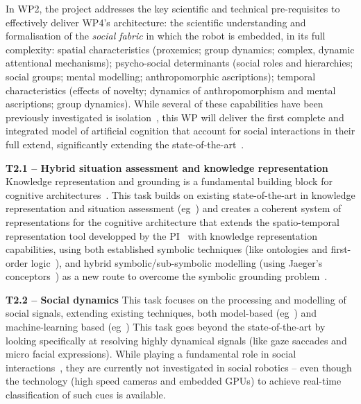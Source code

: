 \documentclass[11pt,a4paper]{report}
\begin{document}
\noindent{}

In WP2, the project addresses the key scientific and technical pre-requisites to
effectively deliver WP4's architecture:  the scientific understanding and
formalisation of the \emph{social fabric} in which the robot is embedded, in its
full complexity: spatial characteristics (proxemics; group dynamics; complex,
dynamic attentional mechanisms); psycho-social determinants (social roles and
hierarchies; social groups; mental modelling; anthropomorphic ascriptions);
temporal characteristics (effects of novelty; dynamics of anthropomorphism and
mental ascriptions; group dynamics).  While several of these capabilities have
been previously investigated is isolation~\cite{lemaignan2014dynamics,
flook2019impact,lemaignan2015youre, fink2014which, ros2010which,
warnier2012when, lemaignan2015mutual, dillenbourg2016symmetry,
winkle2019effective}, this WP will deliver the first complete and integrated
model of artificial cognition that account for social interactions in their full
extend, significantly extending the state-of-the-art~\cite{lemaignan2017artificial,
baxter2016cognitive}.


\textbf{T2.1 -- Hybrid situation assessment and knowledge representation}
Knowledge representation and grounding is a fundamental building block for
cognitive architectures~\cite{lemaignan2017artificial,beetz2010cram}. This task
builds on existing state-of-the-art in knowledge representation and situation
assessment (eg~\cite{citeneeded}) and creates a coherent system of
representations for the cognitive architecture that extends the 
spatio-temporal representation tool developped by the
PI~\cite{lemaignan2018underworlds,sallami2019simulation} with knowledge
representation capabilities, using both established symbolic techniques (like
ontologies and first-order logic~\cite{lemaignan2010oro, tenorth2009knowrob}),
and hybrid symbolic/sub-symbolic modelling (using Jaeger's
conceptors~\cite{jaeger2014controlling}) as a new route to overcome the symbolic
grounding problem~\cite{harnad1990symbol}.

\textbf{T2.2 -- Social dynamics} This task focuses on the processing and
modelling of social signals, extending existing techniques, both model-based
(eg~\cite{lemaignan2016realtime,others}) and machine-learning based
(eg~\cite{chetouani,others}) This task goes beyond the state-of-the-art by
looking specifically at resolving highly dynamical signals (like gaze saccades
and micro facial expressions). While playing a fundamental role in social
interactions~\cite{citeneeded}, they are currently not investigated in social
robotics -- even though the technology (high speed cameras and embedded GPUs) to
achieve real-time classification of such cues is available.
\end{document}
